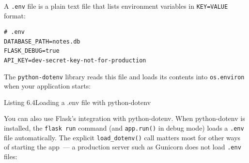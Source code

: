 A \texttt{.env} file is a plain text file that lists environment variables in \texttt{KEY=VALUE} format:

\begin{outputbox}[short]
\begin{Verbatim}[fontsize=\codesize, breaklines, breakanywhere, breaksymbolleft={\tiny\textcolor{muted}{$\hookrightarrow$}}]
# .env
DATABASE_PATH=notes.db
FLASK_DEBUG=true
API_KEY=dev-secret-key-not-for-production
\end{Verbatim}
\end{outputbox}

\noindent{}The \texttt{python-dotenv} library reads this file and loads its contents into \texttt{os.environ} when your application starts:

\begin{codebox}[short]

\begin{Shaded}
\begin{Highlighting}[]
\end{Highlighting}
\end{Shaded}

\end{codebox}

\begin{codeboxcap}[short]{\textcolor{accent}{Listing 6.4}\enspace Loading a .env file with python-dotenv}

\begin{Shaded}
\begin{Highlighting}[]


\OperatorTok{=}\NormalTok{, }\NormalTok{)}
\end{Highlighting}
\end{Shaded}

\end{codeboxcap}

\noindent{}You can also use Flask's integration with python-dotenv. When python-dotenv is installed, the \texttt{flask\ run} command (and \texttt{app.run()} in debug mode) loads a \texttt{.env} file automatically. The explicit \texttt{load\_dotenv()} call matters most for other ways of starting the app~--- a production server such as Gunicorn does not load \texttt{.env} files:

